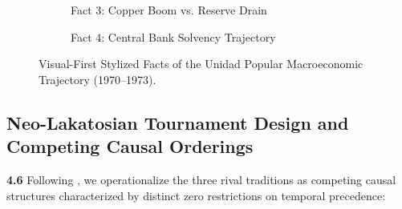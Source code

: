 \begin{figure}[H]
\begin{subfigure}[b]{0.48\textwidth}
\caption{Fact 3: Copper Boom vs. Reserve Drain}
\end{subfigure}
\hfill
\begin{subfigure}[b]{0.48\textwidth}
\centering
{}
\caption{Fact 4: Central Bank Solvency Trajectory}
\end{subfigure}
\caption{Visual-First Stylized Facts of the Unidad Popular Macroeconomic Trajectory (1970--1973).}
\label{fig:stylized_facts_2x2}
\end{figure}

\subsection{Neo-Lakatosian Tournament Design and Competing Causal Orderings}
\label{sec:tournament_design}

\textbf{4.6} Following \citet{KingSznajder2006}, we operationalize the three rival traditions as competing causal structures characterized by distinct zero restrictions on temporal precedence:

